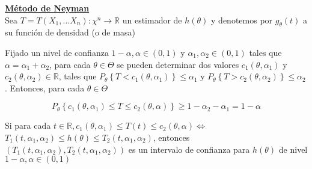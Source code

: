 \underline{\textbf{Método de Neyman}}\\
Sea $T=T\left(X_{1}, \ldots X_{n}\right): \chi^{n} \rightarrow \mathbb{R}$ un
estimador de $h(\theta)$ y denotemos por $g_{\theta}(t)$ a su función de
densidad (o de masa)

Fijado un nivel de confianza $1-\alpha, \alpha \in(0,1)$ y $\alpha_{1},
    \alpha_{2} \in(0,1)$ tales que $\alpha=\alpha_{1}+\alpha_{2}$, para cada
$\theta \in \Theta$ se pueden determinar dos valores $c_{1}\left(\theta,
    \alpha_{1}\right)$ y $c_{2}\left(\theta, \alpha_{2}\right) \in \mathbb{R}$,
tales que $P_{\theta}\left\{T<c_{1}\left(\theta, \alpha_{1}\right)\right\} \leq
    \alpha_{1}$ y $P_{\theta}\left\{T>c_{2}\left(\theta, \alpha_{2}\right)\right\}
    \leq \alpha_{2}$. Entonces, para cada $\theta \in \Theta$

$$
    P_{\theta}\left\{c_{1}\left(\theta, \alpha_{1}\right) \leq T \leq c_{2}(\theta, \alpha)\right\} \geq 1-\alpha_{2}-\alpha_{1}=1-\alpha
$$

Si para cada $t \in \mathbb{R}, c_{1}\left(\theta, \alpha_{1}\right) \leq T(t)
    \leq c_{2}(\theta, \alpha) \Leftrightarrow$\\ $T_{1}\left(t, \alpha_{1},
    \alpha_{2}\right) \leq h(\theta) \leq T_{2}\left(t, \alpha_{1},
    \alpha_{2}\right)$, entonces\\ $\left(T_{1}\left(t, \alpha_{1},
    \alpha_{2}\right), T_{2}\left(t, \alpha_{1}, \alpha_{2}\right)\right)$ es un
intervalo de confianza para $h(\theta)$ de nivel $1-\alpha, \alpha \in(0,1)$

